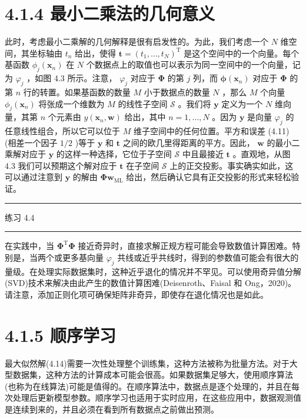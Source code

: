 \documentclass[10pt]{article}
\newcommand{\HRule}{\begin{center}\rule{0.9\linewidth}{0.2mm}\end{center}}
\begin{document}
\section*{4.1.4 最小二乘法的几何意义}

此时，考虑最小二乘解的几何解释是很有启发性的。为此，我们考虑一个 \(N\) 维空间，其坐标轴由 \({t}_{n}\) 给出，使得 \(\mathbf{t} = {\left( {t}_{1},\ldots ,{t}_{N}\right) }^{\mathrm{T}}\) 是这个空间中的一个向量。每个基函数 \({\phi }_{j}\left( {\mathbf{x}}_{n}\right)\) 在 \(N\) 个数据点上的取值也可以表示为同一空间中的一个向量，记为 \({\varphi }_{j}\) ，如图 4.3 所示。注意， \({\varphi }_{j}\) 对应于 \(\mathbf{\Phi }\) 的第 \(j\) 列，而 \(\mathbf{\phi }\left( {\mathbf{x}}_{n}\right)\) 对应于 \(\mathbf{\Phi }\) 的第 \(n\) 行的转置。如果基函数的数量 \(M\) 小于数据点的数量 \(N\) ，那么 \(M\) 个向量 \({\phi }_{j}\left( {\mathbf{x}}_{n}\right)\) 将张成一个维数为 \(M\) 的线性子空间 \(\mathcal{S}\) 。我们将 \(\mathbf{y}\) 定义为一个 \(N\) 维向量，其第 \(n\) 个元素由 \(y\left( {{\mathbf{x}}_{n},\mathbf{w}}\right)\) 给出，其中 \(n = 1,\ldots ,N\) 。因为 \(\mathbf{y}\) 是向量 \({\varphi }_{j}\) 的任意线性组合，所以它可以位于 \(M\) 维子空间中的任何位置。平方和误差 (4.11) (相差一个因子 \(1/2\) )等于 \(\mathbf{y}\) 和 \(\mathbf{t}\) 之间的欧几里得距离的平方。因此， \(\mathbf{w}\) 的最小二乘解对应于 \(\mathbf{y}\) 的这样一种选择，它位于子空间 \(\mathcal{S}\) 中且最接近 \(\mathbf{t}\) 。直观地，从图 4.3 我们可以预期这个解对应于 \(\mathbf{t}\) 在子空间 \(\mathcal{S}\) 上的正交投影。事实确实如此，这可以通过注意到 \(\mathbf{y}\) 的解由 \({\mathbf{{\Phi w}}}_{\mathrm{{ML}}}\) 给出，然后确认它具有正交投影的形式来轻松验证。

\HRule

练习 4.4

\HRule

在实践中，当 \({\mathbf{\Phi }}^{\mathrm{T}}\mathbf{\Phi }\) 接近奇异时，直接求解正规方程可能会导致数值计算困难。特别是，当两个或更多基向量 \({\varphi }_{j}\) 共线或近乎共线时，得到的参数值可能会有很大的量级。在处理实际数据集时，这种近乎退化的情况并不罕见。可以使用奇异值分解(SVD)技术来解决由此产生的数值计算困难(Deisenroth、Faisal 和 Ong，2020)。请注意，添加正则化项可确保矩阵非奇异，即使存在退化情况也是如此。

\section*{4.1.5 顺序学习}

最大似然解(4.14)需要一次性处理整个训练集，这种方法被称为批量方法。对于大型数据集，这种方法的计算成本可能会很高。如果数据集足够大，使用顺序算法(也称为在线算法)可能是值得的。在顺序算法中，数据点是逐个处理的，并且在每次处理后更新模型参数。顺序学习也适用于实时应用，在这些应用中，数据观测值是连续到来的，并且必须在看到所有数据点之前做出预测。
\end{document}
